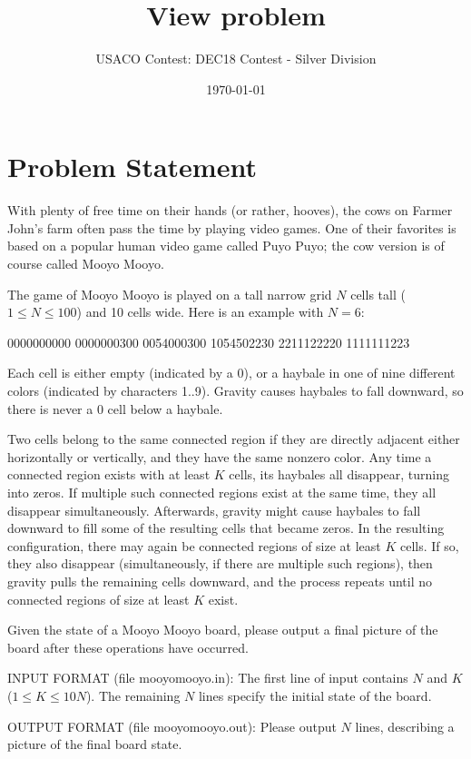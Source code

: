\documentclass[12pt]{article}
\title{View problem}
\author{USACO Contest: DEC18 Contest - Silver Division}
\date{\today}
\begin{document}
\maketitle

\section*{Problem Statement}

With plenty of free time on their hands (or rather, hooves), the cows on Farmer
John's farm often pass the time by playing video games.  One of their favorites
is based on a popular human video game called Puyo Puyo; the cow version is of
course called Mooyo Mooyo.

The game of Mooyo Mooyo is played on a tall narrow grid $N$ cells tall
($1 \leq N \leq 100$) and 10 cells wide.  Here is an example with $N = 6$:


0000000000
0000000300
0054000300
1054502230
2211122220
1111111223

Each cell is either empty (indicated by a 0), or a haybale in one of nine
different colors (indicated by characters 1..9).  Gravity causes haybales to
fall downward, so there is never a 0 cell below a haybale.  

Two cells belong to the same connected region if they are directly adjacent
either horizontally or vertically, and they have the same nonzero color.  Any
time a connected region exists with at least $K$ cells, its haybales all
disappear, turning into zeros.  If multiple such connected regions exist at the
same time, they all disappear simultaneously.  Afterwards, gravity might cause
haybales to fall downward to fill some of the resulting cells that became zeros.
In the resulting configuration, there may again be connected regions of size at
least $K$ cells.  If so, they also disappear (simultaneously, if there are
multiple such regions), then gravity pulls the remaining cells downward, and the
process repeats until no connected regions of size at least $K$ exist.  

Given the state of a Mooyo Mooyo board, please output a final picture of the
board after these operations have occurred.

INPUT FORMAT (file mooyomooyo.in):
The first line of input contains $N$ and $K$ ($1 \leq K \leq 10N$). The
remaining $N$ lines specify the initial state of the board.

OUTPUT FORMAT (file mooyomooyo.out):
Please output $N$ lines, describing a picture of the final board state.
\end{document}
